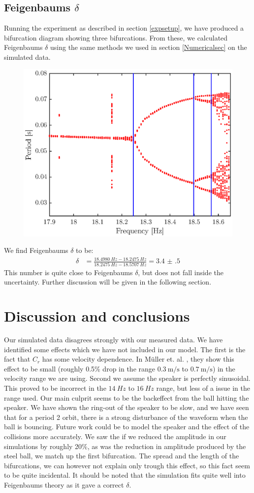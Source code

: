 \documentclass[12pt,oneside,a4paper]{article}
\numberwithin{equation}{section}
\begin{document}
{{{{\subsection{Feigenbaums $\delta$}
Running the experiment as described in section \ref{expsetup}, we have produced a bifurcation diagram showing three bifurcations. From these, we calculated Feigenbaums $\delta$ using the same methods we used in section \ref{Numericalsec} on the simulated data.
\begin{figure}[h]
\centering
\includegraphics[width=0.65\linewidth]{feigplotexp}
\label{expfeigplot}
\end{figure}
We find Feigenbaums $\delta$ to be:
\begin{align}
\delta &= \frac{\SI{18.4980}{Hz}-\SI{18.2475}{Hz}}{\SI{18.2475}{Hz}-\SI{18.5707}{Hz}} = \num{3.4(5)}
\end{align}
This number is quite close to Feigenbaums $\delta$, but does not fall inside the uncertainty. Further discussion will be given in the following section.  
\section{Discussion and conclusions}
Our simulated data disagrees strongly with our measured data. We have identified some effects which we have not included in our model. The first is the fact that $C_r$ has some velocity dependence. In Müller et. al. \cite{muller}, they show this effect to be small (roughly 0.5\% drop in the range $\SI{0.3}{\meter\per\second}$ to $\SI{0.7}{\meter\per\second}$) in the velocity range we are using. Second we assume the speaker is perfectly sinusoidal. This proved to be incorrect in the $\SI{14}{Hz}$ to $\SI{16}{Hz}$ range, but less of a issue in the range used. Our main culprit seems to be the backeffect from the ball hitting the speaker. We have shown the ring-out of the speaker to be slow, and we have seen that for a period 2 orbit, there is a strong disturbance of the waveform when the ball is bouncing. Future work could be to model the speaker and the effect of the collisions more accurately. We saw the if we reduced the amplitude in our simulations by roughly 20\%, as was the reduction in amplitude produced by the steel ball, we match up the first bifurcation. The spread and the length of the bifurcations, we can however not explain only trough this effect, so this fact seem to be quite incidental. It should be noted that the simulation fits quite well into Feigenbaums theory as it gave a correct $\delta$.

}}}}
\end{document}

